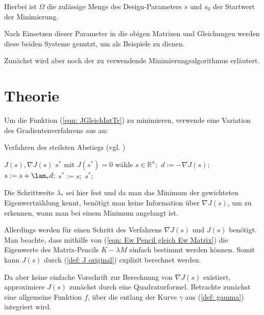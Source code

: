 \documentclass[a4paper,12pt]{report}
\newcommand{\R}{\mathbb R}
\newcommand{\1}{\mathds{1}}
\theoremstyle{plain} %
\theoremstyle{definition} %
\theoremstyle{remark}
\begin{document}
      Hierbei ist $\Omega$ die zulässige Menge des Design-Parameters $s$ und $s_0$ der Startwert der Minimierung.

      Nach Einsetzen dieser Parameter in die obigen Matrizen und Gleichungen werden diese beiden Systeme genutzt, um als Beispiele zu dienen.

      Zunächst wird aber noch der zu verwendende Minimierungsalgorithmus erläutert.
      \section{Theorie}
            Um die Funktion (\ref{eqn: JGleichIntTr}) zu minimieren, verwende eine Variation des Gradientenverfahrens aus \cite[S. 285]{optimierungBurkhard} an:
            \begin{algorithm}
                  \caption{Verfahren des steilsten Abstiegs (vgl. \cite[S. 285]{optimierungBurkhard})}
                  \label{alg: steilster Abstieg}

                  \begin{algorithmic}
                        \Require $J(s), \nabla J(s)$
                        \Ensure $s^*$ mit $J(s^*)=0$
                        \State wähle $s\in \R^n;$
                        \Repeat
                              \State $d:=-\nabla J(s);$
                              \State $s:=s+\lam_*d;$
                        \State $s^*:=s;$
                  \Return $s^*;$
                  \end{algorithmic}
            \end{algorithm}

            Die Schrittweite $\lambda_*$ sei hier fest und da man das Minimum der gewichteten Eigenwertzählung kennt,
            benötigt man keine Information über $\nabla J(s)$, um zu erkennen, wann man bei einem Minimum angelangt ist.

            Allerdings werden für einen Schritt des Verfahrens $\nabla J(s)$ und $J(s)$ benötigt.
            Man beachte, dass mithilfe von (\ref{eqn: Ew Pencil gleich Ew Matrix}) die Eigenwerte des Matrix-Pencils $K-\lambda M$ einfach bestimmt werden können.
            Somit kann $J(s)$ durch (\ref{def: J original}) explizit berechnet werden.

            Da aber keine einfache Vorschrift zur Berechnung von $\nabla J(s)$ existiert, approximiere $J(s)$ zunächst durch eine Quadraturformel.
            Betrachte zunächst eine allgemeine Funktion $f$, über die entlang der Kurve $\gamma$ aus (\ref{def: gamma}) integriert wird.
\end{document}
